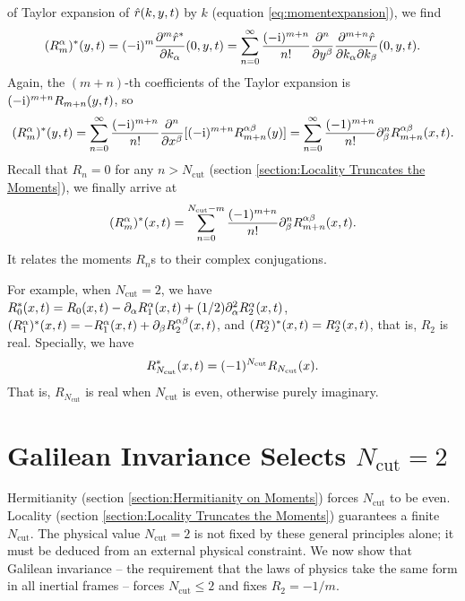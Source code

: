\documentclass{book}
\newcommand{\mathi}{\mathrm{i}}
\newcommand{\tmop}[1]{\ensuremath{\operatorname{#1}}}
\begin{document}
of Taylor expansion of ${\color[HTML]{000000}\hat{r}  (k, y, t)}$ by $k$
(equation \ref{eq:momentexpansion}), we find
\[ {\color[HTML]{000000}(R^{\alpha}_m)^{\ast} (y, t)} = (- \mathi)^m
   \frac{\partial^m {\color[HTML]{000000}\hat{r}^{\ast}}}{\partial k_{\alpha}}
   (0, y, t) = \sum_{n = 0}^{\infty} \frac{(- \mathi)^{m + n}}{n!} 
   \frac{\partial^n}{\partial y^{\beta}}  \frac{\partial^{m + n} 
   {\color[HTML]{000000}\hat{r}}}{\partial k_{\alpha} \partial k_{\beta}}  (0,
   y, t) . \]
Again, the $(m + n)$-th coefficients of the Taylor expansion is $(- \mathi)^{m
+ n} {\color[HTML]{000000}R_{m + n}  (y, t)}$, so
\[ {\color[HTML]{000000}(R^{\alpha}_m)^{\ast} (y, t)} = \sum_{n = 0}^{\infty}
   \frac{(- \mathi)^{m + n}}{n!}  \frac{\partial^n}{\partial x^{\beta}}  [(-
   \mathi)^{m + n} R^{\alpha \beta}_{m + n} (y)] = \sum_{n = 0}^{\infty}
   \frac{(- 1)^{m + n}}{n!} \partial^n_{\beta} {\color[HTML]{000000}R^{\alpha
   \beta}_{m + n}  (x, t)} . \]
Recall that $R_n = 0$ for any $n > N_{\tmop{cut}}$ (section
\ref{section:Locality Truncates the Moments}), we finally arrive at
\begin{equation}
  (R^{\alpha}_m)^{\ast} (x, t) = \sum_{n = 0}^{N_{\tmop{cut}} - m} \frac{(-
  1)^{m + n}}{n!} \partial^n_{\beta} {\color[HTML]{000000}R^{\alpha \beta}_{m
  + n}  (x, t)} .
\end{equation}
It relates the moments $R_n$s to their complex conjugations.

For example, when $N_{\tmop{cut}} = 2$, we have
${\color[HTML]{000000}R_0^{\ast}  (x, t)} = {\color[HTML]{000000}R_0  (x, t)}
- \partial_{\alpha} {\color[HTML]{000000}R^{\alpha}_1  (x, t)} + (1 / 2)
\partial^2_{\alpha} R^{\alpha}_2  (x, t)$, $(R_1^{\alpha})^{\ast} (x, t) = -
{\color[HTML]{000000}R_1^{\alpha}  (x, t)} + \partial_{\beta} R^{\alpha
\beta}_2  (x, t)$, and $(R_2^{\alpha})^{\ast} (x, t) =
{\color[HTML]{000000}R^{\alpha}_2  (x, t)}$, that is, $R_2$ is real.
Specially, we have
\[ {\color[HTML]{000000}R_{N_{\tmop{cut}}}^{\ast}  (x, t)} = (-
   1)^{N_{\tmop{cut}}} R_{N_{\tmop{cut}}} (x) . \]
That is, $R_{N_{\tmop{cut}}}$ is real when $N_{\tmop{cut}}$ is even, otherwise
purely imaginary.

\section{Galilean Invariance Selects $N_{\tmop{cut}} =
2$}\label{section:Galilean Invariance Selects N=2}

Hermitianity (section \ref{section:Hermitianity on Moments}) forces
$N_{\tmop{cut}}$ to be even. Locality (section \ref{section:Locality Truncates
the Moments}) guarantees a finite $N_{\tmop{cut}}$. The physical value
$N_{\tmop{cut}} = 2$ is not fixed by these general principles alone; it must
be deduced from an external physical constraint. We now show that Galilean
invariance -- the requirement that the laws of physics take the same form in
all inertial frames -- forces $N_{\tmop{cut}} \le 2$ and fixes $R_2 = - 1 /
m$.
\end{document}
